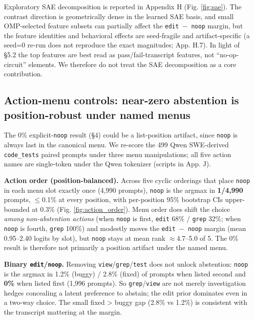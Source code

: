 \documentclass[
  11pt,
  a4paper]{article}
\begin{document}
Exploratory SAE decomposition is reported in Appendix H (Fig.
\ref{fig:sae}). The contrast direction is geometrically dense in the
learned SAE basis, and small OMP-selected feature subsets can partially
affect the \texttt{edit\ \ensuremath{-}\ noop} margin, but the feature identities and
behavioral effects are seed-fragile and artifact-specific (a seed=0
re-run does not reproduce the exact magnitudes; App. H.7). In light of
\S{}5.2 the top features are best read as pass/fail-transcript features,
not ``no-op-circuit'' elements. We therefore do not treat the SAE
decomposition as a core contribution.

\subsection{Action-menu controls: near-zero abstention is
position-robust under named
menus}\label{action-menu-controls-near-zero-abstention-is-position-robust-under-named-menus}

The 0\% explicit-\texttt{noop} result (\S{}4) could be a list-position
artifact, since \texttt{noop} is always last in the canonical menu. We
re-score the 499 Qwen SWE-derived \texttt{code\_tests} paired prompts
under three menu manipulations; all five action names are single-token
under the Qwen tokenizer (scripts in App. J).

\textbf{Action order (position-balanced).} Across five cyclic orderings
that place \texttt{noop} in each menu slot exactly once (4,990 prompts),
\texttt{noop} is the argmax in \textbf{1/4,990} prompts, \ensuremath{\leq}0.1\% at every
position, with per-position 95\% bootstrap CIs upper-bounded at 0.3\%
(Fig. \ref{fig:action_order}). Menu order does shift the choice
\emph{among non-abstention actions} (when \texttt{noop} is first,
\texttt{edit} 68\% / \texttt{grep} 32\%; when \texttt{noop} is fourth,
\texttt{grep} 100\%) and modestly moves the \texttt{edit\ \ensuremath{-}\ noop}
margin (mean 0.95--2.40 logits by slot), but \texttt{noop} stays at mean
rank \ensuremath{\approx}4.7--5.0 of 5. The 0\% result is therefore not primarily a
position artifact under the named menu.

\textbf{Binary \texttt{edit}/\texttt{noop}.} Removing
\texttt{view}/\texttt{grep}/\texttt{test} does not unlock abstention:
\texttt{noop} is the argmax in 1.2\% (buggy) / 2.8\% (fixed) of prompts
when listed second and \textbf{0\%} when listed first (1,996 prompts).
So \texttt{grep}/\texttt{view} are not merely investigation hedges
concealing a latent preference to abstain; the edit prior dominates even
in a two-way choice. The small fixed \textgreater{} buggy gap (2.8\% vs
1.2\%) is consistent with the transcript mattering at the margin.
\end{document}
